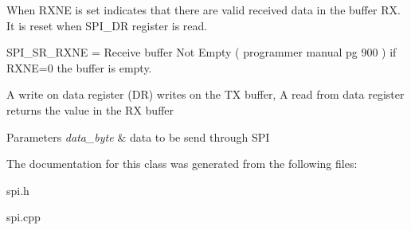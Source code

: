 When R\-X\-N\-E is set indicates that there are valid received data in the buffer R\-X. It is reset when S\-P\-I\-\_\-\-D\-R register is read.

S\-P\-I\-\_\-\-S\-R\-\_\-\-R\-X\-N\-E = Receive buffer Not Empty ( programmer manual pg 900 ) if R\-X\-N\-E=0 the buffer is empty.

A write on data register (D\-R) writes on the T\-X buffer, A read from data register returns the value in the R\-X buffer


\begin{DoxyParams}{Parameters}
{\em data\-\_\-byte} & data to be send through S\-P\-I \\
\hline
\end{DoxyParams}


The documentation for this class was generated from the following files\-:\begin{DoxyCompactItemize}
\item 
spi.\-h\item 
spi.\-cpp\end{DoxyCompactItemize}
